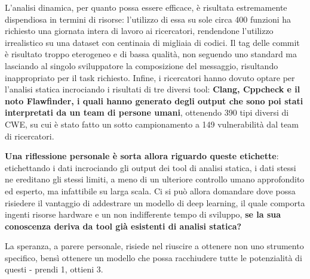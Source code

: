 \documentclass[conference]{IEEEtran}
\begin{document}
L'analisi dinamica, per quanto possa essere efficace, è risultata estremamente dispendiosa in termini di risorse: l'utilizzo di essa su sole circa 400 funzioni ha richiesto una giornata intera di lavoro ai ricercatori, rendendone l'utilizzo irrealistico su una dataset con centinaia di migliaia di codici. Il tag delle commit è risultato troppo eterogeneo e di bassa qualità, non seguendo uno standard ma lasciando al singolo sviluppatore la composizione del messaggio, risultando inappropriato per il task richiesto. Infine, i ricercatori hanno dovuto optare per l'analisi statica incrociando i risultati di tre diversi tool: \textbf{Clang, Cppcheck e il noto Flawfinder, i quali hanno generato degli output che sono poi stati interpretati da un team di persone umani}, ottenendo 390 tipi diversi di CWE, su cui è stato fatto un sotto campionamento a 149 vulnerabilità dal team di ricercatori. 

\textbf{Una riflessione personale è sorta allora riguardo queste etichette}: etichettando i dati incrociando gli output dei tool di analisi statica, i dati stessi ne ereditano gli stessi limiti, a meno di un ulteriore controllo umano approfondito ed esperto, ma infattibile su larga scala. Ci si può allora domandare dove possa risiedere il vantaggio di addestrare un modello di deep learning, il quale comporta ingenti risorse hardware e un non indifferente tempo di sviluppo, \textbf{se la sua conoscenza deriva da tool già esistenti di analisi statica?} 

La speranza, a parere personale, risiede nel riuscire a ottenere non uno strumento specifico, bensì ottenere un modello che possa racchiudere tutte le potenzialità di questi - prendi 1, ottieni 3.
\end{document}
